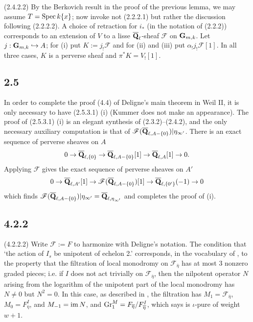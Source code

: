 \documentclass[deligne.tex]{subfiles}
\begin{document}
(2.4.2.2) By the Berkovich result in the proof of the previous lemma,
we may assume $T=\operatorname{Spec} k\{x\}$; now invoke not (2.2.2.1) but rather the
discussion following (2.2.2.2). A choice of retraction for $i_*$ (in the
notation of (2.2.2)) corresponds to an extension of $V$ to a lisse
$\overline{\mathbf{Q}}_\ell$-sheaf $\mathcal F$ on $\mathbf{G}_{m,k}$.
Let $j:\mathbf{G}_{m,k}\hookrightarrow A$; for (i) put $K:=j_!\mathcal F$ and for
(ii) and (iii) put $\alpha_!j_!\mathcal F[1]$. In all three cases,
$K$ is a perverse sheaf \cite[4.1.3]{BBD} and $\pi^*K=V_![1]$.

\subsection*{2.5}
In order to complete the proof (4.4) of Deligne's main theorem in Weil II,
it is only necessary to have (2.5.3.1) (i) (Kummer does not make an 
appearance). The proof of (2.5.3.1) (i) is an elegant synthesis of
(2.3.2)–(2.4.2), and the only necessary auxiliary computation is that of
$\mathscr F(\overline{\mathbf{Q}}_{\ell,A-\{0\}})|\eta_{\infty'}$. There is an exact sequence of
perverse sheaves on $A$ \cite[4.1.10]{BBD}
\begin{equation*}
	0\rightarrow\overline{\mathbf{Q}}_{\ell,\{0\}}
	\rightarrow\overline{\mathbf{Q}}_{\ell,A-\{0\}}[1]
	\rightarrow\overline{\mathbf{Q}}_{\ell,A}[1]\rightarrow0.
\end{equation*}
Applying $\mathscr F$ gives the exact sequence of perverse sheaves on $A'$
\begin{equation*}
	0\rightarrow\overline{\mathbf{Q}}_{\ell,A'}[1]
	\rightarrow\mathscr F(\overline{\mathbf{Q}}_{\ell,A-\{0\}})[1]
	\rightarrow\overline{\mathbf{Q}}_{\ell,\{0'\}}(-1)\rightarrow0
\end{equation*}
which finds
$\mathscr F(\overline{\mathbf{Q}}_{\ell,A-\{0\}})|\eta_{\infty'}= \overline{\mathbf{Q}}_{\ell,\eta_{\infty'}}$ and completes the proof of (i).


\subsection*{4.2.2}
(4.2.2.2) Write $\mathscr F:=F$ to harmonize with Deligne's notation.
The condition that `the action of $I_s$ be unipotent of echelon 2.'
corresponds, in the vocabulary of \cite[1.7.2]{weilii}, to the property that
the filtration of local monodromy on $\mathscr F_{\overline\eta}$ has at
most 3 nonzero graded pieces; i.e. if $I$ does not act trivially on
$\mathscr F_{\overline\eta}$, then the nilpotent operator $N$ arising from
the logarithm of the unipotent part of the local monodromy has $N\ne0$ but
$N^2=0$. In this case, as described in \cite[1.6.1]{weilii}, the filtration
has $M_1=\mathscr F_{\overline\eta}$, $M_0=F_{\overline\eta}^I$, and
$M_{-1}=\operatorname{im} N$, and $\operatorname{Gr}_1^M=F_{\overline\eta}/F_{\overline\eta}^I$, which
\cite[1.8.4]{weilii} says is $\iota$-pure of weight $w+1$.
\end{document}
